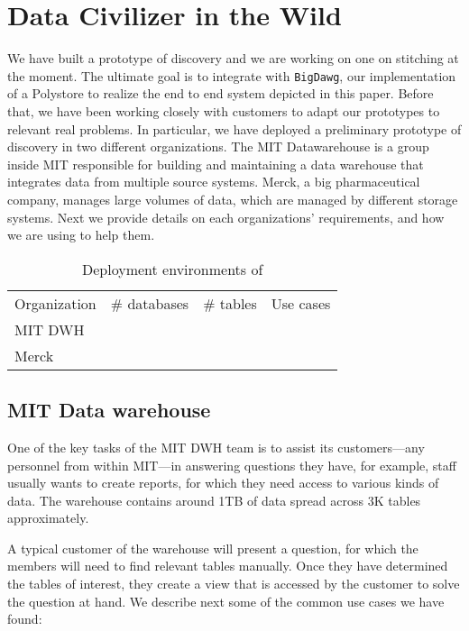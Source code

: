 \section{Data Civilizer in the Wild}
\label{sec:wild}

We have built a prototype of discovery and we are working on one on stitching at the moment. The ultimate goal is to integrate \dcv with \texttt{BigDawg}, our implementation of a Polystore to realize the end to end system depicted in this paper. Before that, we have been working closely with customers to adapt our prototypes to relevant real problems. In particular, we have deployed a preliminary prototype of discovery in two different organizations. The MIT Datawarehouse is a group inside MIT responsible for building and maintaining a data warehouse that integrates data from multiple source systems. Merck, a big pharmaceutical company, manages large volumes of data, which are managed by different storage systems. Next we provide details on each organizations' requirements, and how we are using \dcv to help them.


\begin{table}
\caption{Deployment environments of \dcv{}}\label{tab:dataCivInTheWild}
\begin{tabular}{|l|l|l|l|}
\hline
Organization & \# databases & \# tables & Use cases\\
MIT DWH & & & \\
Merck & & & \\
\hline
\end{tabular}
\end{table}


\subsection{MIT Data warehouse}


One of the key tasks of the MIT DWH team is to assist its customers—any personnel from within MIT—in answering questions they have, for example, staff usually wants to create reports, for which they need access to various kinds of data. The warehouse contains around 1TB of data spread across 3K tables approximately.

A typical customer of the warehouse will present a question, for which the members will need to find relevant tables manually. Once they have determined the tables of interest, they create a view that is accessed by the customer to solve the question at hand. We describe next some of the common use cases we have found:

